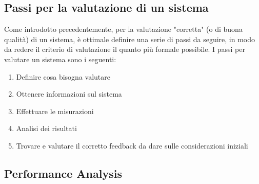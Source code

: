 \subsection{Passi per la valutazione di un sistema}
Come introdotto precedentemente, per la valutazione "corretta" (o di buona qualità) di un sistema, è ottimale definire una serie di passi da seguire, in modo da redere il criterio di valutazione il quanto più formale possibile. I passi per valutare un sistema sono i seguenti:
\begin{enumerate}
    \item Definire cosa bisogna valutare
    \item Ottenere informazioni sul sistema
    \item Effettuare le misurazioni
    \item Analisi dei risultati
    \item Trovare e valutare il corretto feedback da dare sulle considerazioni iniziali
\end{enumerate}

\subsection{Performance Analysis}

